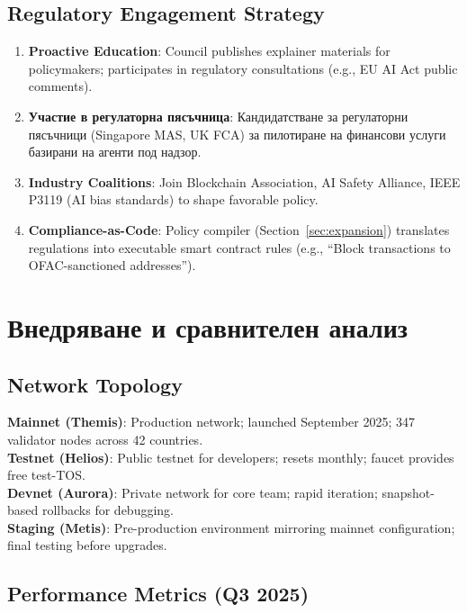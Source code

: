 \documentclass[11pt]{article}
\begin{document}
\subsection{Regulatory Engagement Strategy}

\begin{enumerate}[noitemsep]
  \item \textbf{Proactive Education}: Council publishes explainer materials for policymakers; participates in regulatory consultations (e.g., EU AI Act public comments).
  \item \textbf{Участие в регулаторна пясъчница}: Кандидатстване за регулаторни пясъчници (Singapore MAS, UK FCA) за пилотиране на финансови услуги базирани на агенти под надзор.
  \item \textbf{Industry Coalitions}: Join Blockchain Association, AI Safety Alliance, IEEE P3119 (AI bias standards) to shape favorable policy.
  \item \textbf{Compliance-as-Code}: Policy compiler (Section~\ref{sec:expansion}) translates regulations into executable smart contract rules (e.g., ``Block transactions to OFAC-sanctioned addresses'').
\end{enumerate}

\section{Внедряване и сравнителен анализ}
\label{sec:implementation}

\subsection{Network Topology}

\textbf{Mainnet (Themis)}: Production network; launched September 2025; 347 validator nodes across 42 countries.\\
\textbf{Testnet (Helios)}: Public testnet for developers; resets monthly; faucet provides free test-TOS.\\
\textbf{Devnet (Aurora)}: Private network for core team; rapid iteration; snapshot-based rollbacks for debugging.\\
\textbf{Staging (Metis)}: Pre-production environment mirroring mainnet configuration; final testing before upgrades.

\subsection{Performance Metrics (Q3 2025)}
\end{document}
